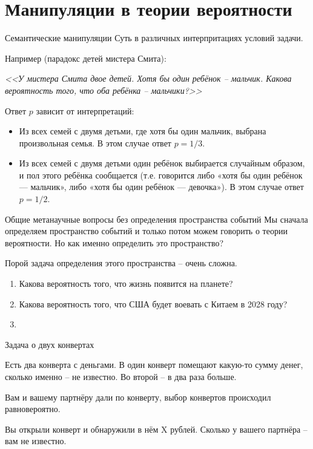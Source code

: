 \section{Манипуляции в теории вероятности}\label{section:manipulations}

\begin{frame}{Семантические манипуляции}
\small
	Суть в различных интерпритациях условий задачи.
	
	Например  (парадокс детей мистера Смита):
\begin{center}
	\textit{
	<<У мистера Смита двое детей. Хотя бы один ребёнок -- мальчик. Какова вероятность того, что оба ребёнка -- мальчики?>>
}
\end{center}

Ответ $p$ зависит от интерпретаций:
\begin{itemize}
	\item Из всех семей с двумя детьми, где хотя бы один мальчик, выбрана произвольная семья. В этом случае ответ $p=1/3$.
	\item Из всех семей с двумя детьми один ребёнок выбирается случайным образом, и пол этого ребёнка сообщается 
	(т.е. говорится либо «хотя бы один ребёнок — мальчик», либо «хотя бы один ребёнок — девочка»). В этом случае ответ $p=1/2$.
\end{itemize}

\end{frame}

\begin{frame}{Общие метанаучные вопросы без определения пространства событий}
	Мы сначала определяем пространство событий и только потом можем говорить о теории вероятности.
	Но как именно определить это пространство?
	
	Порой задача определения этого пространства -- очень сложна.
\begin{enumerate}
	\item Какова вероятность того, что жизнь появится на планете?
	\item Какова вероятность того, что США будет воевать с Китаем в 2028 году?
	\item {}
\end{enumerate}
	
\end{frame}

\begin{frame}{Задача о двух конвертах}

Есть два конверта с деньгами.
В один конверт помещают какую-то сумму денег,
сколько именно -- не известно. 
Во второй -- в два раза больше.

Вам и вашему партнёру дали по конверту, 
выбор конвертов происходил равновероятно.

Вы открыли конверт и обнаружили в нём X рублей.
Сколько у вашего партнёра -- вам не известно.



\end{frame}

